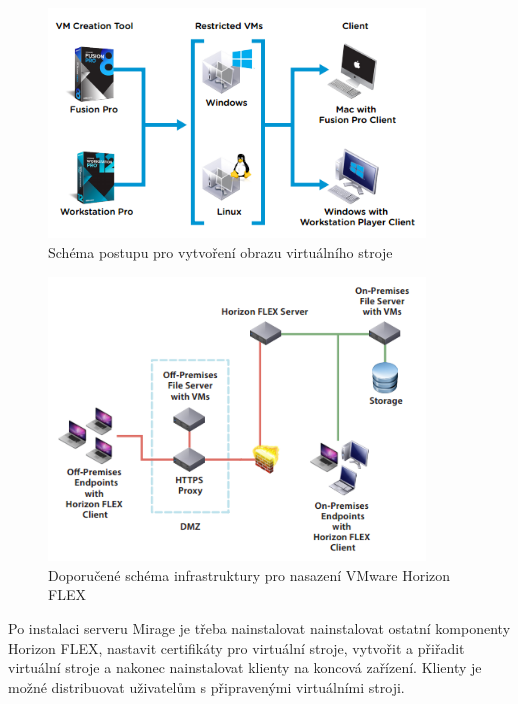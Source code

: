 \begin{figure}[h!]\label{workstation}
\centering
\includegraphics[width=10cm]{img/workstation}
\caption{Schéma postupu pro vytvoření obrazu virtuálního stroje}

\end{figure} 




\begin{figure}[h!]\label{schemaArchitektury}
\centering
\includegraphics[width=10cm]{img/schemaArchitektury}
\caption{Doporučené schéma infrastruktury pro nasazení VMware Horizon FLEX}
\end{figure} 


Po instalaci serveru Mirage je třeba nainstalovat nainstalovat ostatní komponenty Horizon FLEX, nastavit certifikáty pro virtuální stroje, vytvořit a přiřadit virtuální stroje a nakonec nainstalovat klienty na koncová zařízení. Klienty je možné distribuovat uživatelům s připravenými virtuálními stroji. 

